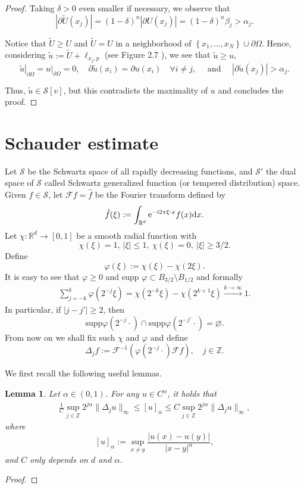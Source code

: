 \documentclass[twoside, 12pt]{book}
\numberwithin{equation}{chapter}
\newtheorem{lemma}[theorem]{Lemma}
\def\mR{{\mathbb R}}
\def\mZ{{\mathbb Z}}
\def\sF{{\mathscr F}}
\def\sS{{\mathscr S}}
\def\geq{\geqslant}
\def\leq{\leqslant}
\def\d{\text{\rm{d}}}
\def\e{\mathrm{e}}
\begin{document}
\begin{proof}
		Taking $\delta>0$ even smaller if necessary, we observe that
		$$
		\left|\partial \widetilde{U}\left(x_j\right)\right|=(1-\delta)^n\left|\partial U\left(x_j\right)\right|=(1-\delta)^n \beta_j>\alpha_j .
		$$
		
		Notice that $\widetilde{U} \geqslant U$ and $\widetilde{U}=U$ in a neighborhood of $\left\{x_1, \ldots, x_N\right\} \cup \partial \Omega$. Hence, considering $\tilde{u}:=\widetilde{U}+\ell_{x_j, p}$ (see Figure 2.7 ), we see that $\tilde{u} \geq u$,
		$$
		\left.\tilde{u}\right|_{\partial \Omega}=\left.u\right|_{\partial \Omega}=0, \quad \partial \tilde{u}\left(x_i\right)=\partial u\left(x_i\right) \quad \forall i \neq j, \quad \text { and } \quad\left|\partial \tilde{u}\left(x_j\right)\right|>\alpha_j .
		$$
		
		Thus, $\tilde{u} \in \mathcal{S}[v]$, but this contradicts the maximality of $u$ and concludes the proof.
	\end{proof}
	
	
	
	\section{Schauder estimate}\label{app:Schauder}
	Let $\sS$ be the Schwartz space of all rapidly decreasing functions, and $\sS'$ the dual space of $\sS$ 
	called Schwartz generalized function (or tempered distribution) space. Given $f\in\sS$,
	let $\sF f=\hat f$  be the Fourier transform defined by
	$$
	\hat f(\xi):=\int_{\mR^d}\e^{-\mathrm{i}2\pi\xi\cdot x} f(x)\d x.
	$$
	Let $\chi:\mR^d\to[0,1]$ be a smooth radial function with 
	$$
	\chi(\xi)=1,\ |\xi|\leq 1,\ \chi(\xi)=0,\ |\xi|\geq 3/2.
	$$
	Define
	$$
	\varphi(\xi):=\chi(\xi)-\chi(2\xi).
	$$
	It is easy to see that $\varphi\geq 0$ and supp $\varphi\subset B_{3/2}\setminus B_{1/2}$ and formally 
	\begin{align}\label{EE1}
		\sum_{j=-k}^k\varphi(2^{-j}\xi)=\chi(2^{-k}\xi)-\chi(2^{k+1}\xi)\stackrel{k\to\infty}{\to} 1.
	\end{align}
	In particular, if $|j-j'|\geq 2$, then
	$$
	\mathrm{supp}\varphi(2^{-j}\cdot)\cap\mathrm{supp}\varphi(2^{-j'}\cdot)=\varnothing.
	$$
	From now on we shall fix such $\chi$ and $\varphi$ and define
	$$
	\Delta_j f:=\sF^{-1}(\varphi(2^{-j}\cdot) \sF f), \quad j\in \mZ.
	$$
	
	We first recall the following useful lemmas. 
	\begin{lemma}
		Let $\alpha\in (0,1)$. For any $u\in C^\alpha$, it holds that 
		\begin{align}\label{Ch}
			\frac{1}{C}\sup_{j\in \mZ} 2^{j\alpha} \|\Delta_j u\|_\infty\leq [u]_{\alpha} \leq C \sup_{j\in \mZ} 2^{j\alpha} \|\Delta_j u\|_\infty, 
		\end{align}
		where 
		\[
		   [u]_\alpha:= \sup_{x\neq y} \frac{|u(x)-u(y)|}{|x-y|^\alpha}, 
		\]
		and $C$ only depends on $d$ and $\alpha$. 
	\end{lemma}
	\begin{proof}
		
	\end{proof}
	
\end{document}
